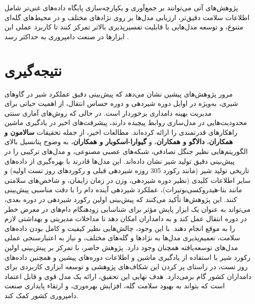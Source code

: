 پژوهش‌های آتی می‌توانند بر جمع‌آوری و یکپارچه‌سازی پایگاه داده‌های غنی‌تر شامل اطلاعات سلامت دقیق‌تر، ارزیابی مدل‌ها بر روی نژادهای مختلف و در محیط‌های گله‌ای متنوع، و توسعه مدل‌هایی با قابلیت تفسیرپذیری بالاتر  تمرکز کنند تا کاربرد عملی این ابزارها در صنعت دامپروری به حداکثر رسد \cite{GuevaraEscobar2022}.
	
\section{نتیجه‌گیری}	
مرور پژوهش‌های پیشین نشان می‌دهد که پیش‌بینی دقیق عملکرد شیر در گاوهای شیری، به‌ویژه در اوایل دوره شیردهی و دوره حساس انتقال، از اهمیت حیاتی برای مدیریت بهینه دامداری برخوردار است. در حالی که روش‌های آماری سنتی محدودیت‌هایی در مدل‌سازی روابط پیچیده دارند، پیشرفت‌های اخیر در یادگیری ماشین راهکارهای قدرتمندی را ارائه کرده‌اند. مطالعات اخیر، از جمله تحقیقات \textbf{سالامون و همکاران}، \textbf{دالاگو و همکاران}، و \textbf{گیوارا-اسکوبار و همکاران}، به وضوح پتانسیل بالای الگوریتم‌هایی نظیر جنگل تصادفی، شبکه‌های عصبی مصنوعی، و مدل‌های ترکیبی را در پیش‌بینی دقیق تولید شیر نشان داده‌اند. این مدل‌ها قادرند با بهره‌گیری از داده‌های تاریخی تولید شیر (مانند رکورد 305	روزه شیردهی قبلی و رکوردهای روز تست اولیه) و سایر اطلاعات کلیدی (نظیر دوره شیردهی، وزن در زمان زایمان، و شاخص‌های سلامتی مانند بتا-هیدروکسی‌بوتیرات)، عملکرد شیردهی آینده دام را با دقت مناسبی پیش‌بینی کنند.
این پژوهش‌ها تأکید می‌کنند که پیش‌بینی اولین رکورد شیردهی در دوره بعدی، می‌تواند به عنوان یک ابزار پایش مؤثر برای شناسایی زودهنگام دام‌های در معرض خطر در دوره انتقال عمل کند و به دامداران امکان دهد تا مداخلات مدیریتی و بهداشتی لازم را به موقع انجام دهند. با این وجود، چالش‌هایی نظیر کیفیت و کامل بودن داده‌های سلامت، تعمیم‌پذیری مدل‌ها به نژادها و گله‌های مختلف، و نیاز به اعتبارسنجی عملی مدل‌های توسعه‌یافته همچنان وجود دارد.
پژوهش حاضر، با تمرکز بر پیش‌بینی اولین رکورد شیر با استفاده از یادگیری ماشین و اطلاعات دوره‌های پیشین و همچنین داده‌های روز تست، در راستای پر کردن این شکاف‌های پژوهشی و توسعه ابزاری کاربردی برای دامداران کشور گام برمی‌دارد. هدف نهایی این تحقیق، ارائه یک مدل قوی و قابل اعتماد است که بتواند به بهبود سلامت گله، افزایش بهره‌وری، و ارتقاء پایداری صنعت دامپروری کشور کمک کند.
	